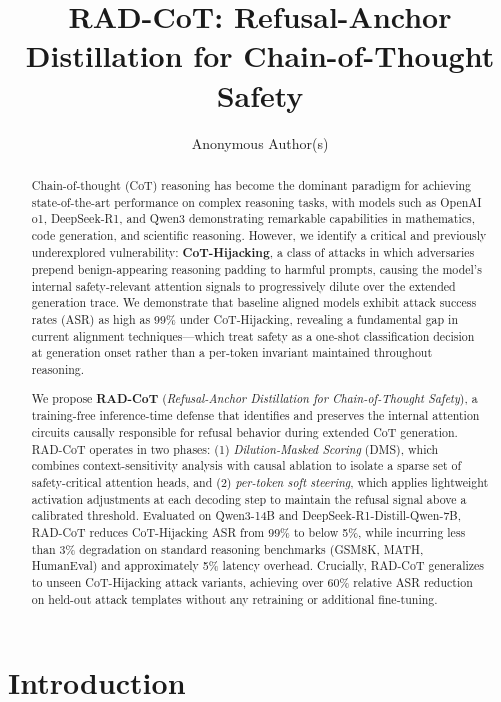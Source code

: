 \documentclass[11pt]{article}
\title{RAD-CoT: Refusal-Anchor Distillation for Chain-of-Thought Safety}
\author{
  Anonymous Author(s)
}
\begin{document}
\maketitle

\begin{abstract}
Chain-of-thought (CoT) reasoning has become the dominant paradigm for achieving state-of-the-art performance on complex reasoning tasks, with models such as OpenAI o1, DeepSeek-R1, and Qwen3 demonstrating remarkable capabilities in mathematics, code generation, and scientific reasoning. However, we identify a critical and previously underexplored vulnerability: \textbf{CoT-Hijacking}, a class of attacks in which adversaries prepend benign-appearing reasoning padding to harmful prompts, causing the model's internal safety-relevant attention signals to progressively dilute over the extended generation trace. We demonstrate that baseline aligned models exhibit attack success rates (ASR) as high as 99\% under CoT-Hijacking, revealing a fundamental gap in current alignment techniques---which treat safety as a one-shot classification decision at generation onset rather than a per-token invariant maintained throughout reasoning.

We propose \textbf{RAD-CoT} (\textit{Refusal-Anchor Distillation for Chain-of-Thought Safety}), a training-free inference-time defense that identifies and preserves the internal attention circuits causally responsible for refusal behavior during extended CoT generation. RAD-CoT operates in two phases: (1) \textit{Dilution-Masked Scoring} (DMS), which combines context-sensitivity analysis with causal ablation to isolate a sparse set of safety-critical attention heads, and (2) \textit{per-token soft steering}, which applies lightweight activation adjustments at each decoding step to maintain the refusal signal above a calibrated threshold. Evaluated on Qwen3-14B and DeepSeek-R1-Distill-Qwen-7B, RAD-CoT reduces CoT-Hijacking ASR from 99\% to below 5\%, while incurring less than 3\% degradation on standard reasoning benchmarks (GSM8K, MATH, HumanEval) and approximately 5\% latency overhead. Crucially, RAD-CoT generalizes to unseen CoT-Hijacking attack variants, achieving over 60\% relative ASR reduction on held-out attack templates without any retraining or additional fine-tuning.
\end{abstract}

\section{Introduction}
\label{sec:introduction}
\end{document}
